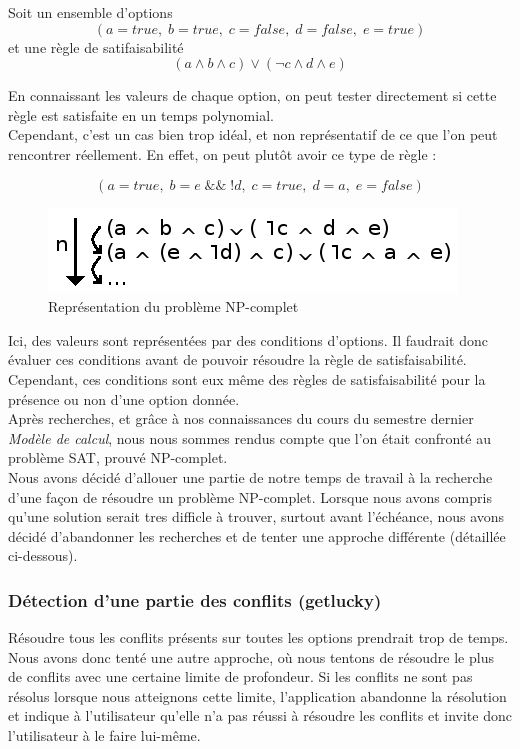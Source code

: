 \documentclass[17pts]{report}
\begin{document}
Soit un ensemble d'options
\begin{equation}
    (a = true,\; b = true,\; c = false,\; d = false,\; e = true)
\end{equation}
et une règle de satifaisabilité
\begin{equation}
(a \land b \land c) \lor (\lnot c \land d \land e)
\end{equation}

En connaissant les valeurs de chaque option, on peut tester directement si cette
règle est satisfaite en un temps polynomial.\\
Cependant, c'est un cas bien trop idéal, et non représentatif de ce que l'on
peut rencontrer réellement. En effet, on peut plutôt avoir ce type de règle :

\begin{equation}
(a = true,\; b = e \;\&\&\; !d,\; c = true,\; d = a,\; e = false)
\end{equation}

\begin{figure}[H]
    \includegraphics[scale=1]{./illustrations/np_complet.png}
    \centering
    \caption{Représentation du problème NP-complet}
    \label{fig:NP-complet}
\end{figure}

Ici, des valeurs sont représentées par des conditions d'options. Il faudrait
donc évaluer ces conditions avant de pouvoir résoudre la règle de
satisfaisabilité. Cependant, ces conditions sont eux même des règles de
satisfaisabilité pour la présence ou non d'une option donnée. \\
Après recherches, et grâce à nos connaissances du cours du semestre dernier
\textit{Modèle de calcul}, nous nous sommes rendus compte que l'on était
confronté au problème SAT, prouvé NP-complet.\\

Nous avons décidé d'allouer une partie de notre temps de travail à la recherche
d'une façon de résoudre un problème NP-complet. Lorsque nous avons compris
qu'une solution serait tres difficle à trouver, surtout avant l'échéance, nous
avons décidé d'abandonner les recherches et de tenter une approche différente
(détaillée ci-dessous).

\subsubsection{Détection d'une partie des conflits (getlucky)}
\label{ssub:Problème NP-Complet (getlucky)}
Résoudre tous les conflits présents sur toutes les options prendrait trop de
temps.  Nous avons donc tenté une autre approche, où nous tentons de résoudre
le plus de conflits avec une certaine limite de profondeur. Si les conflits ne
sont pas résolus lorsque nous atteignons cette limite, l'application abandonne
la résolution et indique à l'utilisateur qu'elle n'a pas réussi à résoudre les
conflits et invite donc l'utilisateur à le faire lui-même.\\
\end{document}
